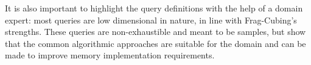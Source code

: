 It is also important to highlight the query definitions with the help of a domain expert: most queries are low dimensional in nature, in line with Frag-Cubing's strengths.
These queries are non-exhaustible and meant to be samples, but show that the common algorithmic approaches are suitable for the domain and can be made to improve memory implementation requirements.

